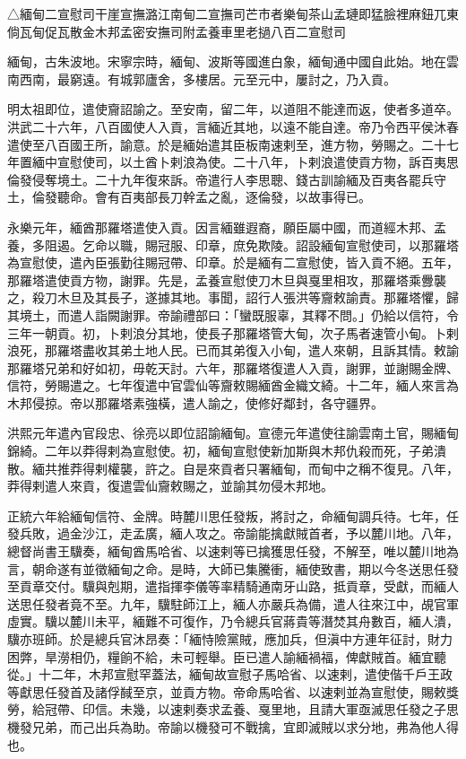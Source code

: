 
\begin{pinyinscope}
△緬甸二宣慰司干崖宣撫潞江南甸二宣撫司芒市者樂甸茶山孟璉即猛臉裡麻鈕兀東倘瓦甸促瓦散金木邦孟密安撫司附孟養車里老撾八百二宣慰司

緬甸，古朱波地。宋寧宗時，緬甸、波斯等國進白象，緬甸通中國自此始。地在雲南西南，最窮遠。有城郭廬舍，多樓居。元至元中，屢討之，乃入貢。

明太祖即位，遣使齎詔諭之。至安南，留二年，以道阻不能達而返，使者多道卒。洪武二十六年，八百國使人入貢，言緬近其地，以遠不能自達。帝乃令西平侯沐春遣使至八百國王所，諭意。於是緬始遣其臣板南速剌至，進方物，勞賜之。二十七年置緬中宣慰使司，以土酋卜剌浪為使。二十八年，卜剌浪遣使貢方物，訴百夷思倫發侵奪境土。二十九年復來訴。帝遣行人李思聰、錢古訓諭緬及百夷各罷兵守土，倫發聽命。會有百夷部長刀幹孟之亂，逐倫發，以故事得已。

永樂元年，緬酋那羅塔遣使入貢。因言緬雖遐裔，願臣屬中國，而道經木邦、孟養，多阻遏。乞命以職，賜冠服、印章，庶免欺陵。詔設緬甸宣慰使司，以那羅塔為宣慰使，遣內臣張勤往賜冠帶、印章。於是緬有二宣慰使，皆入貢不絕。五年，那羅塔遣使貢方物，謝罪。先是，孟養宣慰使刀木旦與戛里相攻，那羅塔乘釁襲之，殺刀木旦及其長子，遂據其地。事聞，詔行人張洪等齎敕諭責。那羅塔懼，歸其境土，而遣人詣闕謝罪。帝諭禮部曰：「蠻既服辜，其釋不問。」仍給以信符，令三年一朝貢。初，卜剌浪分其地，使長子那羅塔管大甸，次子馬者速管小甸。卜剌浪死，那羅塔盡收其弟土地人民。已而其弟復入小甸，遣人來朝，且訴其情。敕諭那羅塔兄弟和好如初，毋乾天討。六年，那羅塔復遣人入貢，謝罪，並謝賜金牌、信符，勞賜遣之。七年復遣中官雲仙等齎敕賜緬酋金織文綺。十二年，緬人來言為木邦侵掠。帝以那羅塔素強橫，遣人諭之，使修好鄰封，各守疆界。

洪熙元年遣內官段忠、徐亮以即位詔諭緬甸。宣德元年遣使往諭雲南土官，賜緬甸錦綺。二年以莽得剌為宣慰使。初，緬甸宣慰使新加斯與木邦仇殺而死，子弟潰散。緬共推莽得剌權襲，許之。自是來貢者只署緬甸，而甸中之稱不復見。八年，莽得剌遣人來貢，復遣雲仙齎敕賜之，並諭其勿侵木邦地。

正統六年給緬甸信符、金牌。時麓川思任發叛，將討之，命緬甸調兵待。七年，任發兵敗，過金沙江，走孟廣，緬人攻之。帝諭能擒獻賊首者，予以麓川地。八年，總督尚書王驥奏，緬甸酋馬哈省、以速剌等已擒獲思任發，不解至，唯以麓川地為言，朝命遂有並徵緬甸之命。是時，大師已集騰衝，緬使致書，期以今冬送思任發至貢章交付。驥與剋期，遣指揮李儀等率精騎通南牙山路，抵貢章，受獻，而緬人送思任發者竟不至。九年，驥駐師江上，緬人亦嚴兵為備，遣人往來江中，覘官軍虛實。驥以麓川未平，緬難不可復作，乃令總兵官蔣貴等潛焚其舟數百，緬人潰，驥亦班師。於是總兵官沐昂奏：「緬恃險黨賊，應加兵，但滇中方連年征討，財力困弊，旱澇相仍，糧餉不給，未可輕舉。臣已遣人諭緬禍福，俾獻賊首。緬宜聽從。」十二年，木邦宣慰罕蓋法，緬甸故宣慰子馬哈省、以速剌，遣使偕千戶王政等獻思任發首及諸俘馘至京，並貢方物。帝命馬哈省、以速剌並為宣慰使，賜敕獎勞，給冠帶、印信。未幾，以速剌奏求孟養、戛里地，且請大軍亟滅思任發之子思機發兄弟，而己出兵為助。帝諭以機發可不戰擒，宜即滅賊以求分地，弗為他人得也。


\end{pinyinscope}
